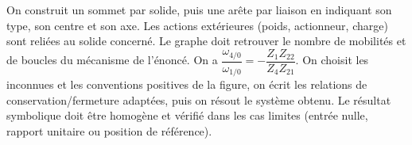 \begin{corrigebox}
On construit un sommet par solide, puis une arête par liaison en
        indiquant son type, son centre et son axe. Les actions extérieures (poids,
        actionneur, charge) sont reliées au solide concerné. Le graphe doit retrouver le
        nombre de mobilités et de boucles du mécanisme de l'énoncé.
On a $\dfrac{\omega_{4/0}}{\omega_{1/0}}=-\dfrac{Z_1Z_{22}}{Z_4Z_{21}}$.
On choisit les inconnues et les conventions positives de la figure,
        on écrit les relations de conservation/fermeture adaptées, puis on résout le
        système obtenu. Le résultat symbolique doit être homogène et vérifié dans les cas
        limites (entrée nulle, rapport unitaire ou position de référence).
\end{corrigebox}
